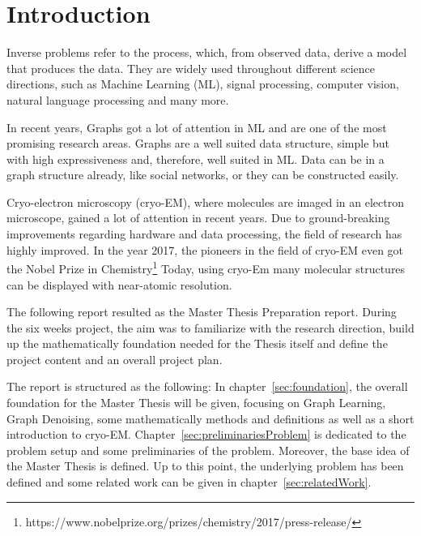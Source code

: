 \chapter{Introduction}
\label{sec:introduction}

Inverse problems refer to the process, which, from observed data, derive a model that produces
the data. They are widely used throughout different science directions, such as Machine Learning (ML),
signal processing, computer vision, natural language processing and many more.

In recent years, Graphs got a lot of attention in ML and are one of the most promising research areas.
Graphs are a well suited data structure, simple but with high expressiveness 
and, therefore, well suited in ML. Data can be in a graph structure already, like social networks, or
they can be constructed easily.

Cryo-electron microscopy (cryo-EM), where molecules are imaged in an electron microscope,
gained a lot of attention in recent years. 
Due to ground-breaking improvements regarding hardware and data processing, the field of research
has highly improved. In the year 2017, the pioneers in the field of cryo-EM even got the 
Nobel Prize in Chemistry\footnote{https://www.nobelprize.org/prizes/chemistry/2017/press-release/}
Today, using cryo-Em many molecular structures can be displayed with near-atomic resolution.

\bigskip

The following report resulted as the Master Thesis Preparation report. During the six weeks project, 
the aim was to familiarize with the research direction, build up the mathematically foundation needed 
for the Thesis itself and define the project content and an overall project plan.

\bigskip

The report is structured as the following:
In chapter~\ref{sec:foundation}, the overall foundation for the Master Thesis will be given, focusing 
on Graph Learning, Graph Denoising, some mathematically methods and definitions as well as
 a short introduction to cryo-EM.
Chapter~\ref{sec:preliminariesProblem} is dedicated to the problem setup and some preliminaries of the problem. 
Moreover, the base idea of the Master Thesis is defined.
Up to this point, the underlying problem has been defined and some related work can be given in chapter~\ref{sec:relatedWork}.




